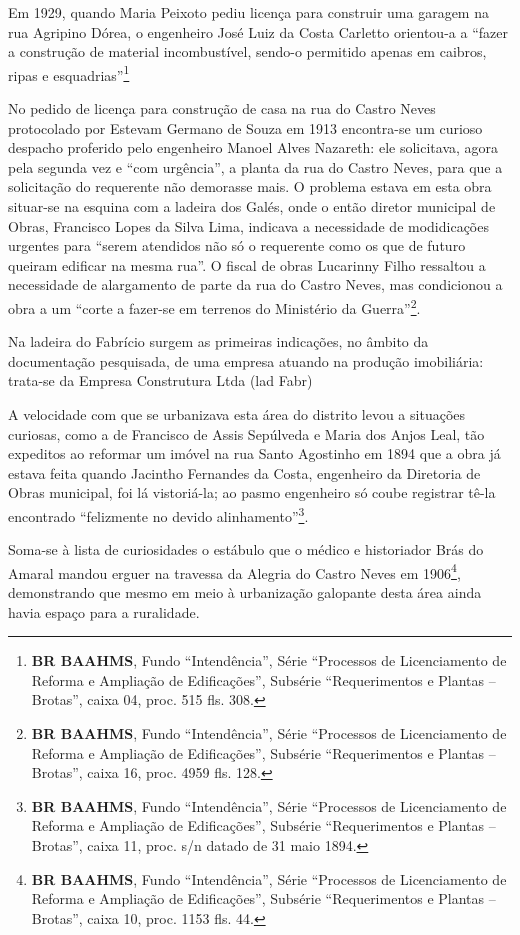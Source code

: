 Em 1929, quando Maria Peixoto pediu licença para construir uma garagem na rua Agripino Dórea, o engenheiro José Luiz da Costa Carletto orientou-a a ``fazer a construção de material incombustível, sendo-o permitido apenas em caibros, ripas e esquadrias''\footnote{\textbf{BR BAAHMS}, Fundo ``Intendência'', Série ``Processos de Licenciamento de Reforma e Ampliação de Edificações'', Subsérie ``Requerimentos e Plantas -- Brotas'', caixa 04, proc. 515 fls. 308.}

No pedido de licença para construção de casa na rua do Castro Neves protocolado por Estevam Germano de Souza em 1913 encontra-se um curioso despacho proferido pelo engenheiro Manoel Alves Nazareth: ele solicitava, agora pela segunda vez e ``com urgência'', a planta da rua do Castro Neves, para que a solicitação do requerente não demorasse mais. O problema estava em esta obra situar-se na esquina com a ladeira dos Galés, onde o então diretor municipal de Obras, Francisco Lopes da Silva Lima, indicava a necessidade de modidicações urgentes para ``serem atendidos não só o requerente como os que de futuro queiram edificar na mesma rua''. O fiscal de obras Lucarinny Filho ressaltou a necessidade de alargamento de parte da rua do Castro Neves, mas condicionou a obra a um ``corte a fazer-se em terrenos do Ministério da Guerra''\footnote{\textbf{BR BAAHMS}, Fundo ``Intendência'', Série ``Processos de Licenciamento de Reforma e Ampliação de Edificações'', Subsérie ``Requerimentos e Plantas -- Brotas'', caixa 16, proc. 4959 fls. 128.}.


Na ladeira do Fabrício surgem as primeiras indicações, no âmbito da documentação pesquisada, de uma empresa atuando na produção imobiliária: trata-se da Empresa Construtura Ltda (lad Fabr)

A velocidade com que se urbanizava esta área do distrito levou a situações curiosas, como a de Francisco de Assis Sepúlveda e Maria dos Anjos Leal, tão expeditos ao reformar um imóvel na rua Santo Agostinho em 1894 que a obra já estava feita quando Jacintho Fernandes da Costa, engenheiro da Diretoria de Obras municipal, foi lá vistoriá-la; ao pasmo engenheiro só coube registrar tê-la encontrado ``felizmente no devido alinhamento''\footnote{\textbf{BR BAAHMS}, Fundo ``Intendência'', Série ``Processos de Licenciamento de Reforma e Ampliação de Edificações'', Subsérie ``Requerimentos e Plantas -- Brotas'', caixa 11, proc. s/n datado de 31 maio 1894.}.

Soma-se à lista de curiosidades o estábulo que o médico e historiador Brás do Amaral mandou erguer na travessa da Alegria do Castro Neves em 1906\footnote{\textbf{BR BAAHMS}, Fundo ``Intendência'', Série ``Processos de Licenciamento de Reforma e Ampliação de Edificações'', Subsérie ``Requerimentos e Plantas -- Brotas'', caixa 10, proc. 1153 fls. 44.}, demonstrando que mesmo em meio à urbanização galopante desta área ainda havia espaço para a ruralidade.

